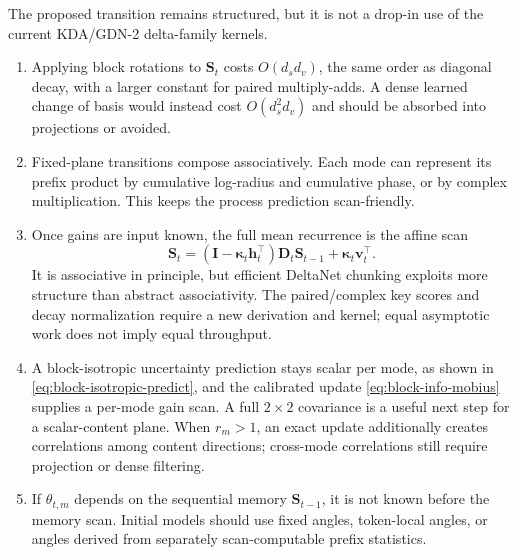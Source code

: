 \documentclass[11pt]{article}
\newcommand{\ve}[1]{\boldsymbol{#1}}
\newcommand{\tr}{\intercal}
\newcommand{\I}{\ve{I}}
\begin{document}
The proposed transition remains structured, but it is not a drop-in use of the current
KDA/GDN-2 delta-family kernels.
\begin{enumerate}[leftmargin=1.7em,itemsep=4pt]
  \item Applying block rotations to $\ve{S}_t$ costs $O(d_s d_v)$, the same order as diagonal
  decay, with a larger constant for paired multiply-adds. A dense learned change of basis
  would instead cost $O(d_s^2d_v)$ and should be absorbed into projections or avoided.

  \item Fixed-plane transitions compose associatively. Each mode can represent its prefix
  product by cumulative log-radius and cumulative phase, or by complex multiplication. This
  keeps the process prediction scan-friendly.

  \item Once gains are input known, the full mean recurrence is the affine scan
  \begin{equation}
    \ve{S}_t
    =(\I-\ve{\kappa}_t\ve{h}_t^{\tr})\ve{D}_t\ve{S}_{t-1}
     +\ve{\kappa}_t\ve{v}_t^{\tr}.
  \end{equation}
  It is associative in principle, but efficient DeltaNet chunking exploits more structure
  than abstract associativity. The paired/complex key scores and decay normalization require
  a new derivation and kernel; equal asymptotic work does not imply equal throughput.

  \item A block-isotropic uncertainty prediction stays scalar per mode, as shown in
  \eqref{eq:block-isotropic-predict}, and the calibrated update
  \eqref{eq:block-info-mobius} supplies a per-mode gain scan. A full $2\times2$ covariance is
  a useful next step for a scalar-content plane. When $r_m>1$, an exact update additionally
  creates correlations among content directions; cross-mode correlations still require
  projection or dense filtering.

  \item If $\theta_{t,m}$ depends on the sequential memory $\ve{S}_{t-1}$, it is not known
  before the memory scan. Initial models should use fixed angles, token-local angles, or angles
  derived from separately scan-computable prefix statistics.
\end{enumerate}
\end{document}

